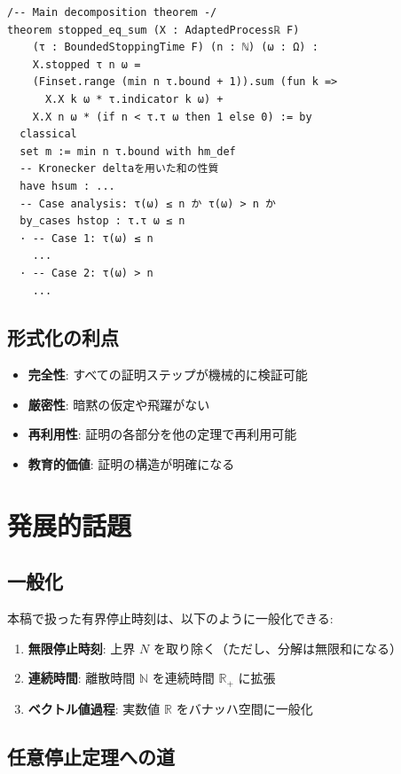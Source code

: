 \documentclass[a4paper,12pt]{ltjsarticle}
\theoremstyle{definition}
\begin{document}
\begin{lstlisting}[style=lean, caption=主定理]
/-- Main decomposition theorem -/
theorem stopped_eq_sum (X : AdaptedProcessℝ F)
    (τ : BoundedStoppingTime F) (n : ℕ) (ω : Ω) :
    X.stopped τ n ω =
    (Finset.range (min n τ.bound + 1)).sum (fun k =>
      X.X k ω * τ.indicator k ω) +
    X.X n ω * (if n < τ.τ ω then 1 else 0) := by
  classical
  set m := min n τ.bound with hm_def
  -- Kronecker deltaを用いた和の性質
  have hsum : ...
  -- Case analysis: τ(ω) ≤ n か τ(ω) > n か
  by_cases hstop : τ.τ ω ≤ n
  · -- Case 1: τ(ω) ≤ n
    ...
  · -- Case 2: τ(ω) > n
    ...
\end{lstlisting}

\subsection{形式化の利点}

\begin{itemize}
\item \textbf{完全性}: すべての証明ステップが機械的に検証可能
\item \textbf{厳密性}: 暗黙の仮定や飛躍がない
\item \textbf{再利用性}: 証明の各部分を他の定理で再利用可能
\item \textbf{教育的価値}: 証明の構造が明確になる
\end{itemize}

\section{発展的話題}

\subsection{一般化}

本稿で扱った有界停止時刻は、以下のように一般化できる:

\begin{enumerate}
\item \textbf{無限停止時刻}: 上界 $N$ を取り除く（ただし、分解は無限和になる）
\item \textbf{連続時間}: 離散時間 $\mathbb{N}$ を連続時間 $\mathbb{R}_+$ に拡張
\item \textbf{ベクトル値過程}: 実数値 $\mathbb{R}$ をバナッハ空間に一般化
\end{enumerate}

\subsection{任意停止定理への道}
\end{document}
